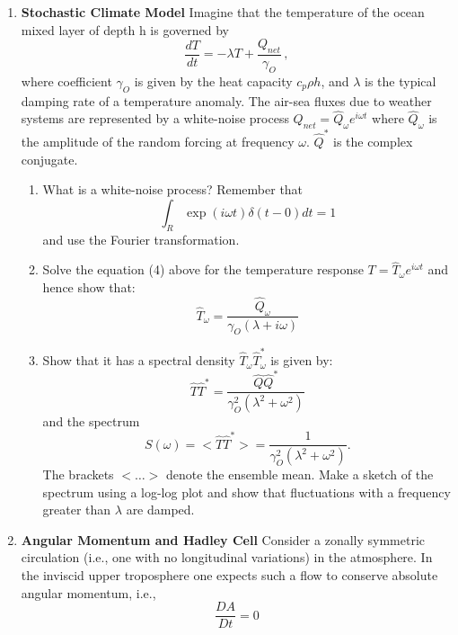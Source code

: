 \documentclass[a4paper,12pt]{article}
\begin{document}
\begin{enumerate}
\item {\bf Stochastic Climate Model} Imagine that the temperature of
  the ocean mixed layer of depth h is governed by 
\begin{equation}
      \frac{dT}{dt} = -\lambda T + \frac{Q_{net}}{\gamma_{O}} \, ,
\end{equation}
where coefficient $ \gamma_{O} $ is given by the heat capacity $c_p
\rho h $, and $ \lambda $ is the typical damping rate of a temperature
anomaly.
The air-sea fluxes due to weather systems are represented by a
white-noise process $Q_{net}=\hat{Q}_{\omega}e^{i\omega t}$ where
$\hat{Q}_{\omega}$ is the amplitude of the random forcing at frequency $\omega$. $\hat{Q}^{*}$ is the complex conjugate.

\begin{enumerate}
\item  What is a white-noise process? Remember that 
\begin{equation}
\int_R \exp(i \omega t) \delta(t-0) dt = 1
\end{equation}
and use the Fourier transformation.

\item Solve the equation (4) above for the temperature response $T= \hat{T}_{\omega}
      e^{i\omega t}$ and hence show that:
 \begin{equation}
      \hat{T}_{\omega} = \frac{\hat{Q}_{\omega}}{\gamma_{O}\left({\lambda}+i \omega\right)}
\end{equation}

\item Show that it has a spectral density $\hat{T}_{\omega}\hat{T}^{*}_{\omega}$ is given by:
 \begin{equation}
      \hat{T}\hat{T}^{*}= \frac{\hat{Q}
      \hat{Q}^{*}}{\gamma^{2}_{O}\left({\lambda}^{2}+ \omega^{2}\right)}
\end{equation}
and the spectrum
\begin{equation}
 S(\omega)
      = <\hat{T}\hat{T}^{*}> =
      \frac{1}{\gamma^{2}_{O}\left({\lambda}^{2}+ \omega^{2}\right)}.
\end{equation}
The brackets $ < \dots >$ denote the ensemble mean.
Make a sketch of the spectrum using a log-log plot and show that fluctuations with a frequency greater than ${\lambda}$ are damped.
\end{enumerate}

\item {\bf Angular Momentum and Hadley Cell} Consider a
      zonally symmetric circulation (i.e., one with no longitudinal
      variations) in the atmosphere. In the inviscid upper troposphere
      one expects such a flow to conserve absolute angular momentum,
      i.e., 
\begin{equation}
\frac{DA}{Dt}=0
\end{equation}


\end{enumerate}
\end{document}

